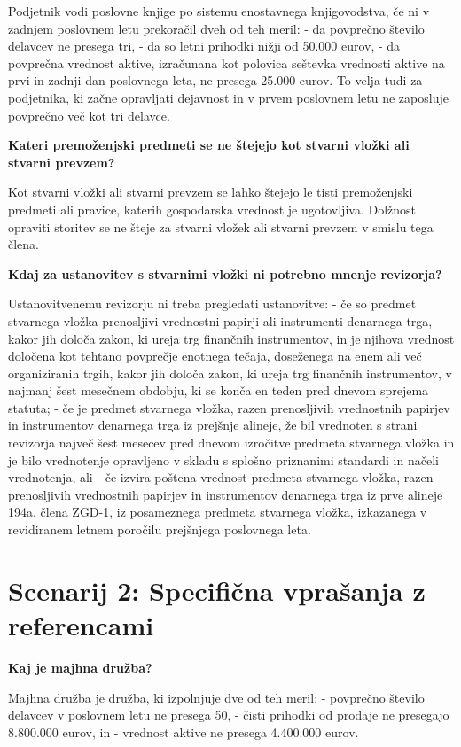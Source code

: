 \documentclass[a4paper,12pt,openright]{book}
\begin{document}
Podjetnik vodi poslovne knjige po sistemu enostavnega knjigovodstva, če ni v zadnjem poslovnem letu prekoračil dveh od teh meril:
- da povprečno število delavcev ne presega tri,
- da so letni prihodki nižji od 50.000 eurov,
- da povprečna vrednost aktive, izračunana kot polovica seštevka vrednosti aktive na prvi in zadnji dan poslovnega leta, ne presega 25.000 eurov. To velja tudi za podjetnika, ki začne opravljati dejavnost in v prvem poslovnem letu ne zaposluje povprečno več kot tri delavce.

\textbf{Kateri premoženjski predmeti se ne štejejo kot stvarni vložki ali stvarni prevzem?}

Kot stvarni vložki ali stvarni prevzem se lahko štejejo le tisti premoženjski predmeti ali pravice, katerih gospodarska vrednost je ugotovljiva. Dolžnost opraviti storitev se ne šteje za stvarni vložek ali stvarni prevzem v smislu tega člena.

\textbf{Kdaj za ustanovitev s stvarnimi vložki ni potrebno mnenje revizorja?}

Ustanovitvenemu revizorju ni treba pregledati ustanovitve:
- če so predmet stvarnega vložka prenosljivi vrednostni papirji ali instrumenti denarnega trga, kakor jih določa zakon, ki ureja trg finančnih instrumentov, in je njihova vrednost določena kot tehtano povprečje enotnega tečaja, doseženega na enem ali več organiziranih trgih, kakor jih določa zakon, ki ureja trg finančnih instrumentov, v najmanj šest mesečnem obdobju, ki se konča en teden pred dnevom sprejema statuta;
- če je predmet stvarnega vložka, razen prenosljivih vrednostnih papirjev in instrumentov denarnega trga iz prejšnje alineje, že bil vrednoten s strani revizorja največ šest mesecev pred dnevom izročitve predmeta stvarnega vložka in je bilo vrednotenje opravljeno v skladu s splošno priznanimi standardi in načeli vrednotenja, ali
- če izvira poštena vrednost predmeta stvarnega vložka, razen prenosljivih vrednostnih papirjev in instrumentov denarnega trga iz prve alineje 194a. člena ZGD-1, iz posameznega predmeta stvarnega vložka, izkazanega v revidiranem letnem poročilu prejšnjega poslovnega leta.

\section*{Scenarij 2: Specifična vprašanja z referencami}

\textbf{Kaj je majhna družba?}

Majhna družba je družba, ki izpolnjuje dve od teh meril:
- povprečno število delavcev v poslovnem letu ne presega 50,
- čisti prihodki od prodaje ne presegajo 8.800.000 eurov, in
- vrednost aktive ne presega 4.400.000 eurov.
\end{document}
